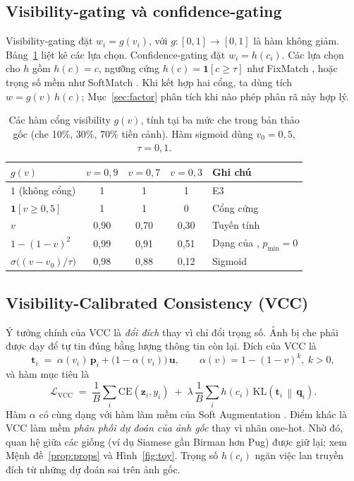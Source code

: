 \documentclass[11pt,a4paper]{article}
\theoremstyle{plain}
\theoremstyle{definition}
\theoremstyle{remark}
\newcommand{\KL}{\mathrm{KL}}
\newcommand{\CE}{\mathrm{CE}}
\newcommand{\bp}{\bm{p}}
\newcommand{\bq}{\bm{q}}
\newcommand{\bt}{\bm{t}}
\newcommand{\bu}{\bm{u}}
\newcommand{\bz}{\bm{z}}
\begin{document}
\subsection{Visibility-gating và confidence-gating}
\label{sec:gates}

Visibility-gating đặt $w_i=g(v_i)$, với $g:[0,1]\to[0,1]$ là hàm không giảm. Bảng~\ref{tab:gates} liệt kê các lựa chọn. Confidence-gating đặt $w_i=h(c_i)$. Các lựa chọn cho $h$ gồm $h(c)=c$, ngưỡng cứng $h(c)=\mathbf{1}[c\ge\tau]$ như FixMatch \cite{sohn2020fixmatch}, hoặc trọng số mềm như SoftMatch \cite{chen2023softmatch}. Khi kết hợp hai cổng, ta dùng tích $w=g(v)\,h(c)$; Mục~\ref{sec:factor} phân tích khi nào phép phân rã này hợp lý.

\begin{table}[t]
\centering
\caption{Các hàm cổng visibility $g(v)$, tính tại ba mức che trong bản thảo gốc (che 10\%, 30\%, 70\% tiền cảnh). Hàm sigmoid dùng $v_0=0{,}5$, $\tau=0{,}1$.}
\label{tab:gates}
\begin{tabular}{@{}lcccl@{}}
\toprule
$g(v)$ & $v=0{,}9$ & $v=0{,}7$ & $v=0{,}3$ & Ghi chú \\
\midrule
$1$ (không cổng) & 1 & 1 & 1 & E3 \\
$\mathbf{1}[v\ge 0{,}5]$ & 1 & 1 & 0 & Cổng cứng \\
$v$ & 0,90 & 0,70 & 0,30 & Tuyến tính \\
$1-(1-v)^2$ & 0,99 & 0,91 & 0,51 & Dạng của \cite{liu2023soft}, $p_{\min}=0$ \\
$\sigma\big((v-v_0)/\tau\big)$ & 0,98 & 0,88 & 0,12 & Sigmoid \\
\bottomrule
\end{tabular}
\end{table}

\subsection{Visibility-Calibrated Consistency (VCC)}

Ý tưởng chính của VCC là \emph{đổi đích} thay vì chỉ đổi trọng số. Ảnh bị che phải được dạy để tự tin đúng bằng lượng thông tin còn lại. Đích của VCC là
\begin{equation}
  \label{eq:vcc-target}
  \bt_i \;=\; \alpha(v_i)\,\bp_i + \big(1-\alpha(v_i)\big)\,\bu,
  \qquad \alpha(v)=1-(1-v)^k,\ k>0,
\end{equation}
và hàm mục tiêu là
\begin{equation}
  \label{eq:vcc}
  \mathcal{L}_{\mathrm{VCC}} \;=\; \frac{1}{B}\sum_{i}\CE(\bz_i,y_i)
  \;+\;\lambda\,\frac{1}{B}\sum_{i} h(c_i)\,\KL\!\left(\bt_i\,\middle\|\,\bq_i\right).
\end{equation}
Hàm $\alpha$ có cùng dạng với hàm làm mềm của Soft Augmentation \cite{liu2023soft}. Điểm khác là VCC làm mềm \emph{phân phối dự đoán của ảnh gốc} thay vì nhãn one-hot. Nhờ đó, quan hệ giữa các giống (ví dụ Siamese gần Birman hơn Pug) được giữ lại; xem Mệnh đề~\ref{prop:props} và Hình~\ref{fig:toy}. Trọng số $h(c_i)$ ngăn việc lan truyền đích từ những dự đoán sai trên ảnh gốc.
\end{document}
